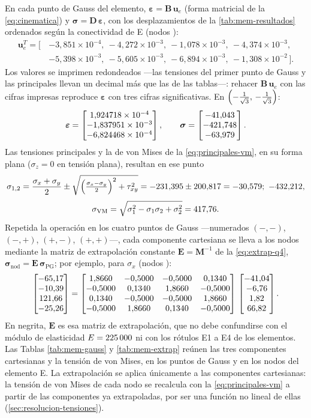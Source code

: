 En cada punto de Gauss del elemento, $\bm{\varepsilon}=\bm{B}\,\bm{u}_e$ (forma matricial de la \autoref{eq:cinematica}) y $\bm{\sigma}=\bm{D}\,\bm{\varepsilon}$, con los desplazamientos de la \autoref{tab:mem-resultados} ordenados según la conectividad de E\showId{} (nodos \showNodes):
\[
\begin{aligned}
\bm{u}_e^{T}=\bigl[\,&{-}3{,}851\times10^{-4},\ -4{,}272\times10^{-3},\ -1{,}078\times10^{-3},\ -4{,}374\times10^{-3},\\
&{-}5{,}398\times10^{-3},\ -5{,}605\times10^{-3},\ -6{,}894\times10^{-3},\ -1{,}308\times10^{-2}\,\bigr].
\end{aligned}
\]
Los valores se imprimen redondeados ---las tensiones del primer punto de Gauss y las principales llevan un decimal más que las de las tablas---: rehacer $\bm{B}\,\bm{u}_e$ con las cifras impresas reproduce $\bm{\varepsilon}$ con tres cifras significativas. En $\left(-\tfrac{1}{\sqrt{3}},\,-\tfrac{1}{\sqrt{3}}\right)$:
\[
\bm{\varepsilon}=\begin{bmatrix} 1{,}924718\times10^{-4} \\ -1{,}837951\times10^{-3} \\ -6{,}824468\times10^{-4} \end{bmatrix},
\qquad
\bm{\sigma}=\begin{bmatrix} -41{,}043 \\ -421{,}748 \\ -63{,}979 \end{bmatrix} .
\]
Las tensiones principales y la de von Mises de la \autoref{eq:principales-vm}, en su forma plana ($\sigma_z = 0$ en tensión plana), resultan en ese punto
\[
\sigma_{1,2}=\frac{\sigma_x+\sigma_y}{2}\pm\sqrt{\Bigl(\tfrac{\sigma_x-\sigma_y}{2}\Bigr)^{2}+\tau_{xy}^{2}}=\savgA\pm\radiusA=\sigOneA;\ \sigTwoA ,
\]
\[
\sigma_{\mathrm{VM}}=\sqrt{\sigma_1^{2}-\sigma_1\sigma_2+\sigma_2^{2}}=417{,}76 .
\]
Repetida la operación en los cuatro puntos de Gauss —numerados $(-,-)$, $(-,+)$, $(+,-)$, $(+,+)$—, cada componente cartesiana se lleva a los nodos mediante la matriz de extrapolación constante $\bm{E}=\bm{M}^{-1}$ de la \autoref{eq:extrap-q4}, $\bm{\sigma}_{\mathrm{nod}}=\bm{E}\,\bm{\sigma}_{\mathrm{PG}}$; por ejemplo, para $\sigma_x$ (nodos \showNodes):
{\footnotesize\setlength{\arraycolsep}{4pt}
\[
\begin{bmatrix} -65{,}17 \\ -10{,}39 \\ 121{,}66 \\ -25{,}26 \end{bmatrix}=\begin{bmatrix} 1{,}8660 & -0{,}5000 & -0{,}5000 & 0{,}1340 \\ -0{,}5000 & 0{,}1340 & 1{,}8660 & -0{,}5000 \\ 0{,}1340 & -0{,}5000 & -0{,}5000 & 1{,}8660 \\ -0{,}5000 & 1{,}8660 & 0{,}1340 & -0{,}5000 \end{bmatrix}\,\begin{bmatrix} -41{,}04 \\ -6{,}76 \\ 1{,}82 \\ 66{,}82 \end{bmatrix} .
\]
}%
En negrita, $\bm{E}$ es esa matriz de extrapolación, que no debe confundirse con el módulo de elasticidad $E=225\,000$ ni con los rótulos E1 a E4 de los elementos.
Las Tablas \ref{tab:mem-gauss} y \ref{tab:mem-extrap} reúnen las tres componentes cartesianas y la tensión de von Mises, en los puntos de Gauss y en los nodos del elemento E\showId{}. La extrapolación se aplica únicamente a las componentes cartesianas: la tensión de von Mises de cada nodo se recalcula con la \autoref{eq:principales-vm} a partir de las componentes ya extrapoladas, por ser una función no lineal de ellas (\autoref{sec:resolucion-tensiones}).

